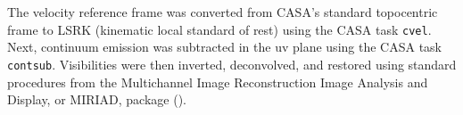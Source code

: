 The velocity reference frame was converted from CASA's standard topocentric frame to LSRK (kinematic local standard of rest) using the CASA task \texttt{cvel}. Next, continuum emission was subtracted in the uv plane using the CASA task \texttt{contsub}. Visibilities were then inverted, deconvolved, and restored using standard procedures from the Multichannel Image Reconstruction Image Analysis and Display, or MIRIAD, package (\citet{rj_sault_astronomical_1995}).






